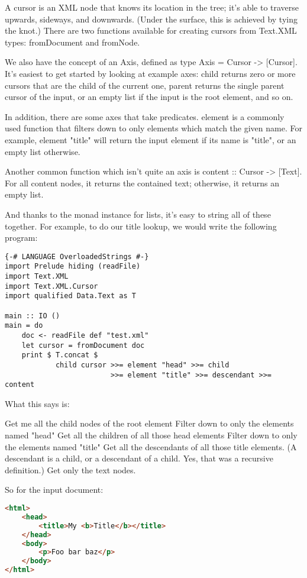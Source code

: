 A cursor is an XML node that knows its location in the tree; it's able to traverse
upwards, sideways, and downwards. (Under the surface, this is achieved by tying
the knot.) There are two functions available for creating cursors from
Text.XML types: fromDocument and fromNode.

We also have the concept of an Axis, defined as type Axis = Cursor -> [Cursor]. It's easiest to get started by looking at
example axes: child returns zero or more cursors that are the child of the current one, parent
returns the single parent cursor of the input, or an empty list if the input is the root element,
and so on.

In addition, there are some axes that take predicates. element is a commonly
used function that filters down to only elements which match the given name. For example,
element "title" will return the input element if its name is "title", or an
empty list otherwise.

Another common function which isn't quite an axis is content :: Cursor ->
[Text]. For all content nodes, it returns the contained text; otherwise, it returns an
empty list.

And thanks to the monad instance for lists, it's easy to string all of these
together. For example, to do our title lookup, we would write the following program:

\begin{lstlisting}
{-# LANGUAGE OverloadedStrings #-}
import Prelude hiding (readFile)
import Text.XML
import Text.XML.Cursor
import qualified Data.Text as T

main :: IO ()
main = do
    doc <- readFile def "test.xml"
    let cursor = fromDocument doc
    print $ T.concat $
            child cursor >>= element "head" >>= child
                         >>= element "title" >>= descendant >>= content
\end{lstlisting}

What this says is:

  
Get me all the child nodes of the root element
Filter down to only the elements named "head"
Get all the children of all those head elements
Filter down to only the elements named "title"
Get all the descendants of all those title elements. (A descendant is a child, or a
descendant of a child. Yes, that was a recursive definition.)
Get only the text nodes.
  
So for the input document:

\begin{lstlisting}[language=HTML]
  <html>
    <head>
        <title>My <b>Title</b></title>
    </head>
    <body>
        <p>Foo bar baz</p>
    </body>
</html>
\end{lstlisting}

